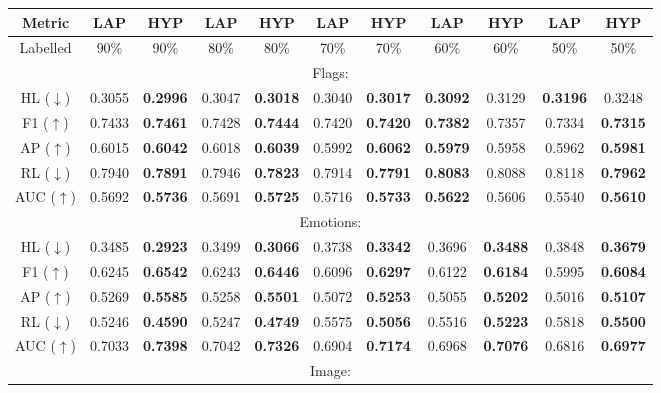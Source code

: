 \documentclass[12pt,a4paper,oneside,english]{report}
\begin{document}
\begin{table}[htbp]
\fontsize{6pt}{7pt}\selectfont
\centering
\begin{tabular}{|c|cc|cc|cc|cc|cc|}
\hline
Metric & LAP & HYP & LAP & HYP & LAP & HYP & LAP & HYP & LAP & HYP \\ 
\hline
Labelled & 90\% & 90\% & 80\% & 80\% & 70\% & 70\% & 60\% & 60\% & 50\% & 50\% \\ 
\hline
\multicolumn{11}{|c|}{Flags:} \\ 
\hline
HL ($\downarrow$) & 0.3055 & \textbf{0.2996} & 0.3047 & \textbf{0.3018} & 0.3040 & \textbf{0.3017} & \textbf{0.3092} & 0.3129 & \textbf{0.3196} & 0.3248 \\
F1 ($\uparrow$) & 0.7433 & \textbf{0.7461} & 0.7428 & \textbf{0.7444} & 0.7420 & \textbf{0.7420} & \textbf{0.7382} & 0.7357 & 0.7334 & \textbf{0.7315} \\
AP ($\uparrow$) & 0.6015 & \textbf{0.6042} & 0.6018 & \textbf{0.6039} & 0.5992 & \textbf{0.6062} & \textbf{0.5979} & 0.5958 & 0.5962 & \textbf{0.5981} \\
RL ($\downarrow$) & 0.7940 & \textbf{0.7891} & 0.7946 & \textbf{0.7823} & 0.7914 & \textbf{0.7791} & \textbf{0.8083} & 0.8088 & 0.8118 & \textbf{0.7962} \\
AUC ($\uparrow$) & 0.5692 & \textbf{0.5736} & 0.5691 & \textbf{0.5725} & 0.5716 & \textbf{0.5733} & \textbf{0.5622} & 0.5606 & 0.5540 & \textbf{0.5610} \\ 
\hline
\multicolumn{11}{|c|}{Emotions:} \\ 
\hline
HL ($\downarrow$) & 0.3485 & \textbf{0.2923} & 0.3499 & \textbf{0.3066} & 0.3738 & \textbf{0.3342} & 0.3696 & \textbf{0.3488} & 0.3848 & \textbf{0.3679} \\
F1 ($\uparrow$) & 0.6245 & \textbf{0.6542} & 0.6243 & \textbf{0.6446} & 0.6096 & \textbf{0.6297} & 0.6122 & \textbf{0.6184} & 0.5995 & \textbf{0.6084} \\
AP ($\uparrow$) & 0.5269 & \textbf{0.5585} & 0.5258 & \textbf{0.5501} & 0.5072 & \textbf{0.5253} & 0.5055 & \textbf{0.5202} & 0.5016 & \textbf{0.5107} \\
RL ($\downarrow$) & 0.5246 & \textbf{0.4590} & 0.5247 & \textbf{0.4749} & 0.5575 & \textbf{0.5056} & 0.5516 & \textbf{0.5223} & 0.5818 & \textbf{0.5500} \\
AUC ($\uparrow$) & 0.7033 & \textbf{0.7398} & 0.7042 & \textbf{0.7326} & 0.6904 & \textbf{0.7174} & 0.6968 & \textbf{0.7076} & 0.6816 & \textbf{0.6977} \\ 
\hline
\multicolumn{11}{|c|}{Image:} \\ 

\end{tabular}
\end{table}
\end{document}
